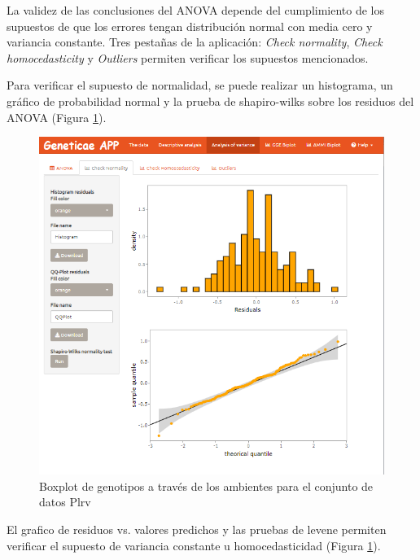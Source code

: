 La validez de las conclusiones del ANOVA depende del cumplimiento de los supuestos de que los errores tengan distribución normal con media cero y variancia constante. Tres pestañas de la aplicación: \emph{Check normality}, \emph{Check homocedasticity} y \emph{Outliers} permiten verificar los supuestos mencionados.

Para verificar el supuesto de normalidad, se puede realizar un histograma, un gráfico de probabilidad normal y la prueba de shapiro-wilks sobre los residuos del ANOVA (Figura \ref{fig:fig49}).

\begin{figure}[H]
	\begin{center}
		\includegraphics[width=14cm]{./Graficos/Normalidad.png}
	\end{center}
	\caption{Boxplot de genotipos a través de los ambientes para el conjunto de datos Plrv}
	\label{fig:fig49}
\end{figure}

El grafico de residuos vs. valores predichos y las pruebas de levene permiten verificar el supuesto de variancia constante u homocedasticidad (Figura \ref{fig:fig49}).

